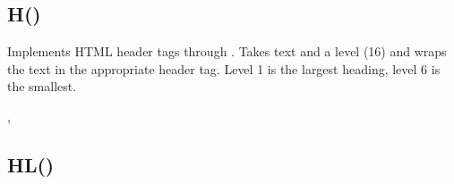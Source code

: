 \documentclass[letterpaper,10pt,english]{sphinxmanual}
\begin{document}
\ignorespaces 

\subsection{H()}
\label{\detokenize{reference/html:h}}\label{\detokenize{reference/html:index-4}}
\sphinxAtStartPar
{}

\sphinxAtStartPar
Implements HTML header tags  through . Takes text and a level (1\sphinxhyphen{}6) and wraps the text in the appropriate header tag. Level 1 is the largest heading, level 6 is the smallest.

\sphinxAtStartPar
{}

\begin{sphinxVerbatim}[commandchars=\\\{\}]
\end{sphinxVerbatim}

\sphinxAtStartPar
{}

\begin{sphinxVerbatim}[commandchars=\\\{\}]

\end{sphinxVerbatim}

\sphinxAtStartPar
{}

\sphinxAtStartPar
{}, 

\ignorespaces 

\subsection{HL()}
\label{\detokenize{reference/html:hl}}\label{\detokenize{reference/html:index-5}}
\sphinxAtStartPar
{}
\end{document}
